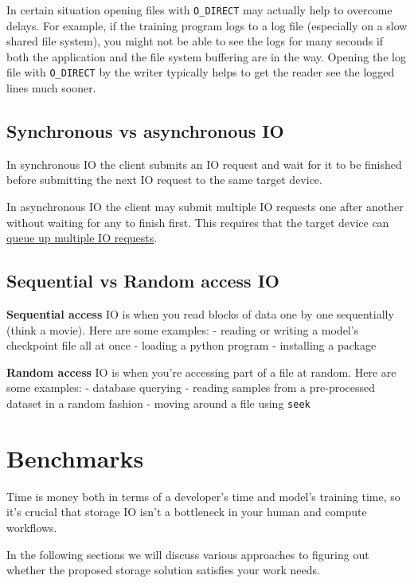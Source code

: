 \documentclass[
]{report}
\begin{document}
In certain situation opening files with \texttt{O\_DIRECT} may actually
help to overcome delays. For example, if the training program logs to a
log file (especially on a slow shared file system), you might not be
able to see the logs for many seconds if both the application and the
file system buffering are in the way. Opening the log file with
\texttt{O\_DIRECT} by the writer typically helps to get the reader see
the logged lines much sooner.

\subsection{Synchronous vs asynchronous
IO}\label{synchronous-vs-asynchronous-io}

In synchronous IO the client submits an IO request and wait for it to be
finished before submitting the next IO request to the same target
device.

In asynchronous IO the client may submit multiple IO requests one after
another without waiting for any to finish first. This requires that the
target device can \hyperref[queue-depth]{queue up multiple IO requests}.

\subsection{Sequential vs Random access
IO}\label{sequential-vs-random-access-io}

\textbf{Sequential access} IO is when you read blocks of data one by one
sequentially (think a movie). Here are some examples: - reading or
writing a model's checkpoint file all at once - loading a python program
- installing a package

\textbf{Random access} IO is when you're accessing part of a file at
random. Here are some examples: - database querying - reading samples
from a pre-processed dataset in a random fashion - moving around a file
using \texttt{seek}

\section{Benchmarks}\label{benchmarks}

Time is money both in terms of a developer's time and model's training
time, so it's crucial that storage IO isn't a bottleneck in your human
and compute workflows.

In the following sections we will discuss various approaches to figuring
out whether the proposed storage solution satisfies your work needs.
\end{document}
